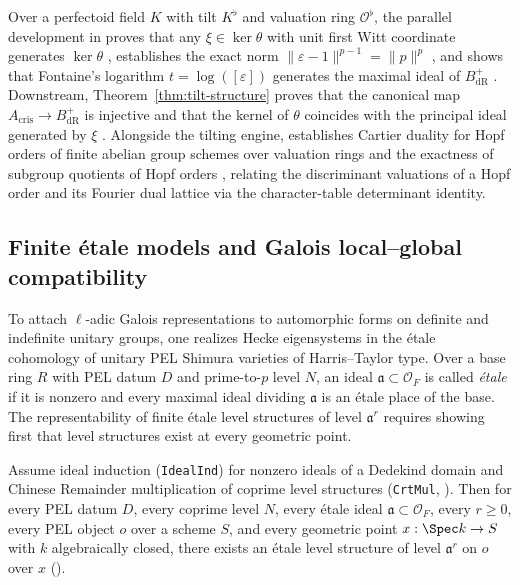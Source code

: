 Over a perfectoid field $K$ with tilt $K^\flat$ and valuation ring
$\mathcal{O}^\flat$, the parallel development in
 proves that any $\xi \in \ker\theta$ with
unit first Witt coordinate generates $\ker\theta$
,
establishes the exact norm $\|\varepsilon - 1\|^{p-1} = \|p\|^p$
, and shows that
Fontaine's logarithm $t = \log([\varepsilon])$ generates the maximal ideal of
$B_{\mathrm{dR}}^+$
. Downstream,
Theorem~\ref{thm:tilt-structure} proves that the canonical map
$A_{\mathrm{cris}} \to B_{\mathrm{dR}}^+$ is injective
 and that the kernel of $\theta$
coincides with the principal ideal generated by $\xi$
. Alongside the tilting
engine,  establishes Cartier duality
for Hopf orders of finite abelian group schemes over valuation rings
 and the exactness of subgroup quotients
of Hopf orders , relating the
discriminant valuations of a Hopf order and its Fourier dual lattice via the
character-table determinant identity.

\subsection{Finite étale models and Galois local--global compatibility}

To attach $\ell$-adic Galois representations to automorphic forms on definite
and indefinite unitary groups, one realizes Hecke eigensystems in the étale
cohomology of unitary PEL Shimura varieties of Harris--Taylor type. Over a base
ring $R$ with PEL datum $D$ and prime-to-$p$ level $N$, an ideal
$\mathfrak{a} \subset \mathcal{O}_F$ is called \emph{étale}
 if it is nonzero and
every maximal ideal dividing $\mathfrak{a}$ is an étale place of the base.
The representability of finite étale level structures of level $\mathfrak{a}^r$
requires showing first that level structures exist at every geometric point.

\begin{theorem}
\label{thm:ptall}
Assume ideal induction (\texttt{IdealInd}) for nonzero ideals of a Dedekind
domain and Chinese Remainder multiplication of coprime level structures
(\texttt{CrtMul}, ). Then
for every PEL datum $D$, every coprime level $N$, every étale ideal
$\mathfrak{a} \subset \mathcal{O}_F$, every $r \ge 0$, every PEL object
$o$ over a scheme $S$, and every geometric point $x : \Spec k \to S$ with $k$
algebraically closed, there exists an étale level structure of level
$\mathfrak{a}^r$ on $o$ over $x$
().
\end{theorem}

